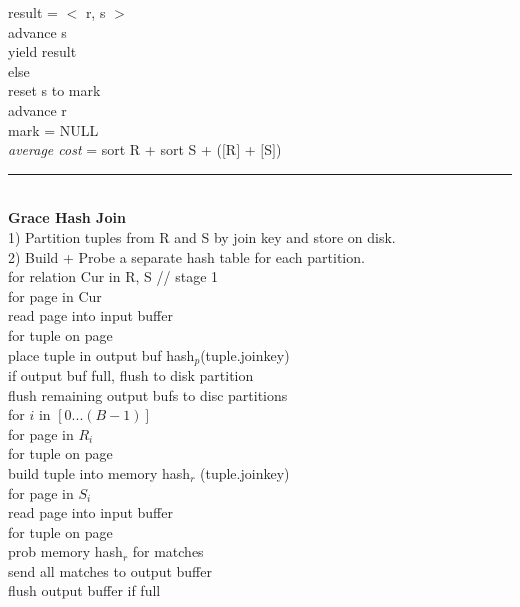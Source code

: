 \documentclass[10pt,landscape]{article}
\newcommand{\ruler}{\\\rule{\columnwidth}{0.25pt}\\}
\begin{document}
\begin{multicols*}{3}
\-\hspace{0.5cm} result = $<$ r, s $>$\\
\-\hspace{0.5cm} advance s\\
\-\hspace{0.5cm} yield result\\
else\\
\-\hspace{0.5cm} reset s to mark\\
\-\hspace{0.5cm} advance r\\
\-\hspace{0.5cm} mark = NULL\\
\textit{average cost} = sort R + sort S + ($[$R$]$ + $[$S$]$)
\ruler
\textbf{Grace Hash Join}\\
1) Partition tuples from R and S by join key and store on disk.\\
2) Build + Probe a separate hash table for each partition.\\
for relation Cur in {R, S} // stage 1\\ 
\-\hspace{0.5cm} for page in Cur\\
\-\hspace{1.0cm} read page into input buffer\\
\-\hspace{1.0cm} for tuple on page\\
\-\hspace{1.5cm} place tuple in output buf hash$_p$(tuple.joinkey)\\
\-\hspace{1.5cm} if output buf full, flush to disk partition\\
\-\hspace{0.5cm} flush remaining output bufs to disc partitions\\
for $i$ in $[0...(B-1)]$\\
\-\hspace{0.5cm} for page in $R_i$\\
\-\hspace{1.0cm} for tuple on page\\
\-\hspace{1.5cm} build tuple into memory hash$_r$ (tuple.joinkey)\\
\-\hspace{0.5cm} for page in $S_i$\\
\-\hspace{1.0cm} read page into input buffer\\
\-\hspace{1.0cm} for tuple on page\\
\-\hspace{1.5cm} prob memory hash$_r$ for matches\\
\-\hspace{1.5cm} send all matches to output buffer\\
\-\hspace{1.5cm} flush output buffer if full\\


\end{multicols*}
\end{document}
